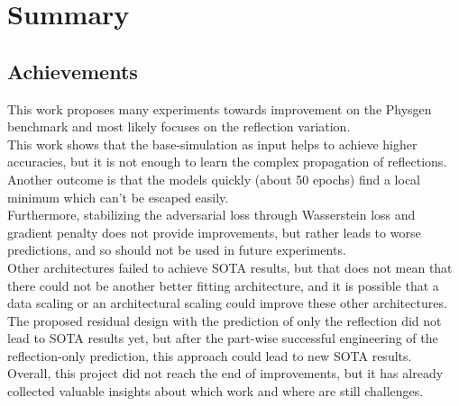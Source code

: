 \chapter{Summary}
\label{cha:summary}
	
	
	\section{Achievements}
	\label{sec:sum-reached}
		This work proposes many experiments towards improvement on the Physgen benchmark and most likely focuses on the reflection variation.\\
		This work shows that the base-simulation as input helps to achieve higher accuracies, but it is not enough to learn the complex propagation of reflections. Another outcome is that the models quickly (about 50 epochs) find a local minimum which can't be escaped easily.\\
		Furthermore, stabilizing the adversarial loss through Wasserstein loss and gradient penalty does not provide improvements, but rather leads to worse predictions, and so should not be used in future experiments.\\
		Other architectures failed to achieve SOTA results, but that does not mean that there could not be another better fitting architecture, and it is possible that a data scaling or an architectural scaling could improve these other architectures. \\
		The proposed residual design with the prediction of only the reflection did not lead to SOTA results yet, but after the part-wise successful engineering of the reflection-only prediction, this approach could lead to new SOTA results.\\
		Overall, this project did not reach the end of improvements, but it has already collected valuable insights about which work and where are still challenges.
	
